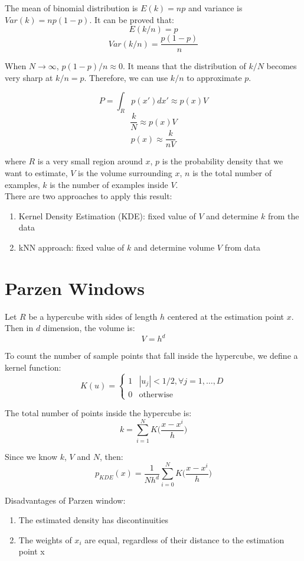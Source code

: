 \begin{multicols*}{2}
\noindent The mean of binomial distribution is $E(k)=np$ and variance is $Var(k)=np(1-p)$. It can be proved that:
$$E(k / n) = p$$
$$Var(k / n) = \frac{p(1-p)}{n}$$

\noindent When $N\rightarrow \infty$, $p(1-p)/n \approx 0$. It means that the distribution of $k/N$ becomes very sharp at $k/n=p$. Therefore, we can use $k/n$ to approximate $p$.

$$P = \int_R p(x') dx' \approx p(x) V$$
$$\frac{k}{N} \approx p(x) V$$
$$p(x) \approx \frac{k}{nV}$$

\noindent where $R$ is a very small region around $x$, $p$ is the probability density that we want to estimate, $V$ is the volume surrounding $x$, $n$ is the total number of examples, $k$ is the number of examples inside $V$.\\

\noindent There are two approaches to apply this result:
\begin{enumerate}
    \item Kernel Density Estimation (KDE): fixed value of $V$ and determine $k$ from the data
    \item kNN approach: fixed value of $k$ and determine volume $V$ from data
\end{enumerate}

\section{Parzen Windows}

\noindent Let $R$ be a hypercube with sides of length $h$ centered at the estimation point $x$. Then in $d$ dimension, the volume is:
$$V=h^d$$

\noindent To count the number of sample points that fall inside the hypercube, we define a kernel function:
$$K(u) = 
\begin{cases}
1 & |u_j| < 1/2, \forall j=1,\ldots,D \\
0 & \text{otherwise}
\end{cases}
$$

\noindent The total number of points inside the hypercube is:
$$k= \sum_{i=1}^{N} K\Big( \frac{x-x^i}{h}\Big)$$

\noindent Since we know $k$, $V$ and $N$, then:
$$p_{KDE}(x) = \frac{1}{Nh^d} \sum_{i=0}^N K \Big( \frac{x-x^i}{h}\Big)$$

\noindent Disadvantages of Parzen window:
\begin{enumerate}
    \item The estimated density has discontinuities
    \item The weights of $x_i$ are equal, regardless of their distance to the estimation point x 
\end{enumerate}


\end{multicols*}
